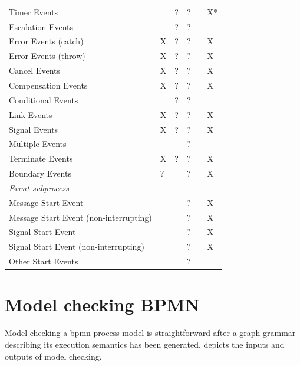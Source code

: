 \documentclass[adraft, copyright, creativecommons]{eptcs} %
\begin{document}
\begin{table}[htbp]
\begin{tabular}{l l l l l l}
      Timer Events &  & ? & ? &  & X*\\
      Escalation Events & & ? & ? &  & \\
      Error Events (catch) & X & ? & ? &  & \color{yellow}X\\ %
      Error Events (throw) & X & ? & ? &  & \color{yellow}X\\
      Cancel Events & X & ? & ? &  & \color{yellow}X\\
      Compensation Events & X & ? & ? &  & \color{yellow}X\\
      Conditional Events &  & ? & ? &  & \\
      Link Events & X & ? & ? &  & X\\
      Signal Events & X & ? & ? &  & X\\
      Multiple Events &  & & ? &  & \\
      Terminate Events & X & ? & ? &  & X\\
     Boundary Events & ? & & ? &  & X\\ %
      \textit{Event subprocess} &  &  &  &  & \\
      Message Start Event &  & & ? &  & X\\
      Message Start Event (non-interrupting) & & & ? &  & X\\
      Signal Start Event &  & & ? &  & X\\
      Signal Start Event (non-interrupting) &  & & ? &  & X\\
      Other Start Events &  & & ? &  & \\ %
    \end{tabular}

\end{table}


\section{Model checking BPMN}
Model checking a \gls*{bpmn} process model is straightforward after a graph grammar describing its execution semantics has been generated.
 depicts the inputs and outputs of model checking.
\end{document}
